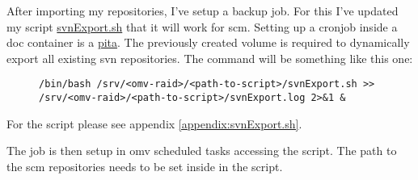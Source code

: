 After importing my repositories, I've setup a backup job. For this I've updated
my script \href{https://github.com/ThirtySomething/NAS}{svnExport.sh} that it
will work for \gls{scm}. Setting up a cronjob inside a \gls{doc} container
is a \href{https://en.wiktionary.org/wiki/pain_in_the_ass}{pita}. The previously
created volume is required to dynamically export all existing \gls{svn}
repositories. The command will be something like this one:

\begin{figure}[H]
    \scriptsize
    \centering
    \begin{BVerbatim}
/bin/bash /srv/<omv-raid>/<path-to-script>/svnExport.sh >>
/srv/<omv-raid>/<path-to-script>/svnExport.log 2>&1 &
    \end{BVerbatim}
\end{figure}

For the script please see appendix \ref{appendix:svnExport.sh}.
\bigbreak

The job is then setup in \gls{omv} scheduled tasks accessing the script.
 The path to the \gls{scm} repositories needs to be set
inside in the script.

